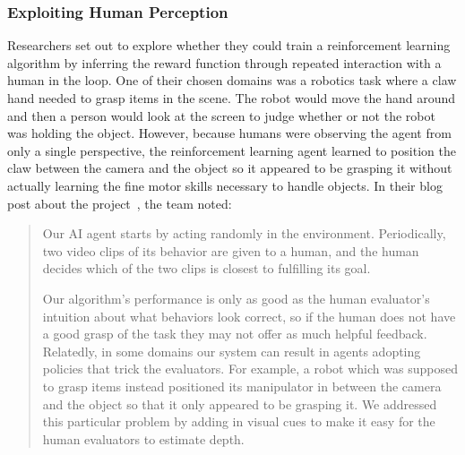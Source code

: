 \subsubsection{Exploiting Human Perception~\citep{christiano2023deepreinforcementlearninghuman, OpenAI_Learning_2017}}
\label{sec:claw}

Researchers set out to explore whether they could train a reinforcement learning algorithm by inferring the reward function through repeated interaction with a human in the loop. One of their chosen domains was a robotics task where a claw hand needed to grasp items in the scene. The robot would move the hand around and then a person would look at the screen to judge whether or not the robot was holding the object. However, because humans were observing the agent from only a single perspective, the reinforcement learning agent learned to position the claw between the camera and the object so it appeared to be grasping it without actually learning the fine motor skills necessary to handle objects. In their blog post about the project~\citep{OpenAI_Learning_2017}, the team noted:

\begin{quote}


Our AI agent starts by acting randomly in the environment. Periodically, two video clips of its behavior are given to a human, and the human decides which of the two clips is closest to fulfilling its goal.

Our algorithm's performance is only as good as the human evaluator's intuition about what behaviors look correct, so if the human does not have a good grasp of the task they may not offer as much helpful feedback. Relatedly, in some domains our system can result in agents adopting policies that trick the evaluators. For example, a robot which was supposed to grasp items instead positioned its manipulator in between the camera and the object so that it only appeared to be grasping it. We addressed this particular problem by adding in visual cues to make it easy for the human evaluators to estimate depth. %
\end{quote}
